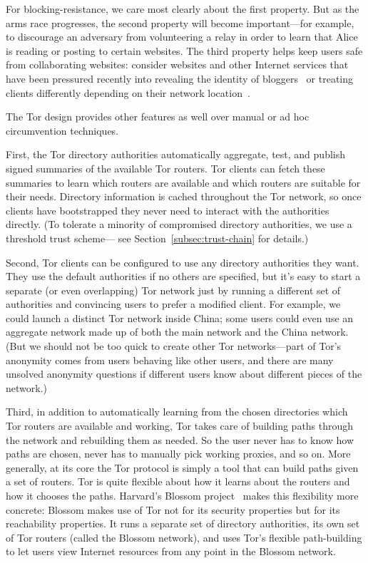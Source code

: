\documentclass{llncs}
\begin{document}
For blocking-resistance, we care most clearly about the first
property. But as the arms race progresses, the second property
will become important---for example, to discourage an adversary
from volunteering a relay in order to learn that Alice is reading
or posting to certain websites. The third property helps keep users safe from
collaborating websites: consider websites and other Internet services 
that have been pressured
recently into revealing the identity of bloggers~\cite{arrested-bloggers}
or treating clients differently depending on their network
location~\cite{google-geolocation}.

The Tor design provides other features as well over manual or ad
hoc circumvention techniques.

First, the Tor directory authorities automatically aggregate, test,
and publish signed summaries of the available Tor routers. Tor clients
can fetch these summaries to learn which routers are available and
which routers are suitable for their needs. Directory information is cached
throughout the Tor network, so once clients have bootstrapped they never
need to interact with the authorities directly. (To tolerate a minority
of compromised directory authorities, we use a threshold trust scheme---
see Section~\ref{subsec:trust-chain} for details.)

Second, Tor clients can be configured to use any directory authorities
they want. They use the default authorities if no others are specified,
but it's easy to start a separate (or even overlapping) Tor network just
by running a different set of authorities and convincing users to prefer
a modified client. For example, we could launch a distinct Tor network
inside China; some users could even use an aggregate network made up of
both the main network and the China network. (But we should not be too
quick to create other Tor networks---part of Tor's anonymity comes from
users behaving like other users, and there are many unsolved anonymity
questions if different users know about different pieces of the network.)

Third, in addition to automatically learning from the chosen directories
which Tor routers are available and working, Tor takes care of building
paths through the network and rebuilding them as needed. So the user
never has to know how paths are chosen, never has to manually pick
working proxies, and so on. More generally, at its core the Tor protocol
is simply a tool that can build paths given a set of routers. Tor is
quite flexible about how it learns about the routers and how it chooses
the paths. Harvard's Blossom project~\cite{blossom-thesis} makes this
flexibility more concrete: Blossom makes use of Tor not for its security
properties but for its reachability properties. It runs a separate set
of directory authorities, its own set of Tor routers (called the Blossom
network), and uses Tor's flexible path-building to let users view Internet
resources from any point in the Blossom network.
\end{document}
